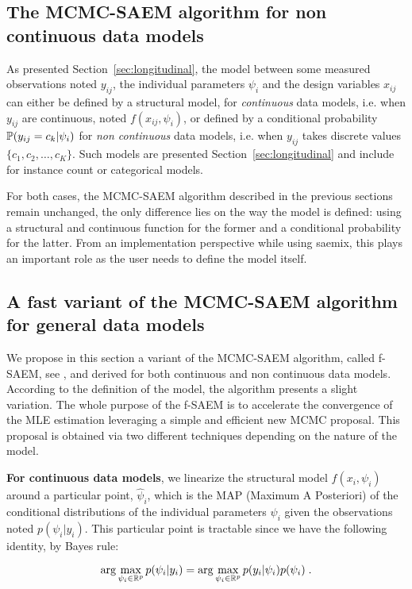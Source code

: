 \subsection{The MCMC-SAEM algorithm for non continuous data models}

As presented Section~\ref{sec:longitudinal}, the model between some measured observations noted $y_{ij}$, the individual parameters $\psi_i$ and the design variables $x_{ij}$ can either be defined by a structural model, for \emph{continuous} data models, i.e. when $y_{ij}$ are continuous, noted $f(x_{ij}, \psi_i)$, or defined by a conditional probability $\mathbb{P}(y_{ij}=c_k|\psi_i)$ for \emph{non continuous} data models, i.e. when $y_{ij}$ takes discrete values $\{c_1, c_2,\ldots , c_K\}$. Such models are presented Section~\ref{sec:longitudinal} and include for instance count or categorical models.

For both cases, the MCMC-SAEM algorithm described in the previous sections remain unchanged, the only difference lies on the way the model is defined: using a structural and continuous function for the former and a conditional probability for the latter. From an implementation perspective while using saemix, this plays an important role as the user needs to define the model itself.

\subsection{A fast variant of the MCMC-SAEM algorithm for general data models}

We propose in this section a variant of the MCMC-SAEM algorithm, called f-SAEM, see \cite{Karimi19}, and derived for both continuous and non continuous data models.
According to the definition of the model, the algorithm presents a slight variation.
The whole purpose of the f-SAEM is to accelerate the convergence of the MLE estimation leveraging a simple and efficient new MCMC proposal.
This proposal is obtained via two different techniques depending on the nature of the model.

\textbf{For continuous data models}, we linearize the structural model $f(x_{i}, \psi_i)$ around a particular point, $\hat{\psi}_i$, which is the MAP (Maximum A Posteriori) of the conditional distributions of the individual parameters $\psi_i$ given the observations noted $p(\psi_i|y_i) $. This particular point is tractable since we have the following identity, by Bayes rule:

\begin{equation}
\arg \max \limits_{\psi_i \in \mathbb{R}^p} p(\psi_i|y_i) = \arg \max \limits_{\psi_i \in \mathbb{R}^p} p(y_i|\psi_i)p(\psi_i) \;.
\end{equation}

